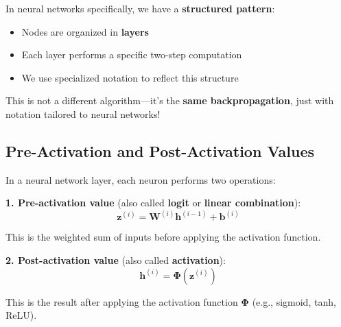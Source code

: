 \begin{notechapter}
\begin{tcolorbox}[colback=yellow!10,colframe=orange!80,title=Why the Notation Changes]
In neural networks specifically, we have a \textbf{structured pattern}:
\begin{itemize}
    \item Nodes are organized in \textbf{layers}
    \item Each layer performs a specific two-step computation
    \item We use specialized notation to reflect this structure
\end{itemize}

This is not a different algorithm—it's the \textbf{same backpropagation}, just with notation tailored to neural networks!
\end{tcolorbox}

\subsection{Pre-Activation and Post-Activation Values}

\begin{definition}
In a neural network layer, each neuron performs two operations:

\textbf{1. Pre-activation value} (also called \textbf{logit} or \textbf{linear combination}):
$$\mathbf{z}^{(i)} = \mathbf{W}^{(i)} \mathbf{h}^{(i-1)} + \mathbf{b}^{(i)}$$

This is the weighted sum of inputs before applying the activation function.

\textbf{2. Post-activation value} (also called \textbf{activation}):
$$\mathbf{h}^{(i)} = \boldsymbol{\Phi}(\mathbf{z}^{(i)})$$

This is the result after applying the activation function $\boldsymbol{\Phi}$ (e.g., sigmoid, tanh, ReLU).
\end{definition}

\begin{center}
\end{center}
\end{notechapter}
